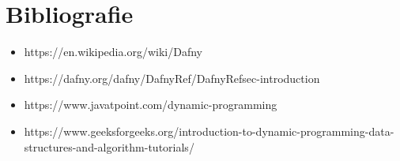 \chapter*{Bibliografie} 

\begin{itemize}
    \item https://en.wikipedia.org/wiki/Dafny
    \item https://dafny.org/dafny/DafnyRef/DafnyRef{\texthash}sec-introduction
    \item https://www.javatpoint.com/dynamic-programming
    \item https://www.geeksforgeeks.org/introduction-to-dynamic-programming-data-structures-and-algorithm-tutorials/
\end{itemize}